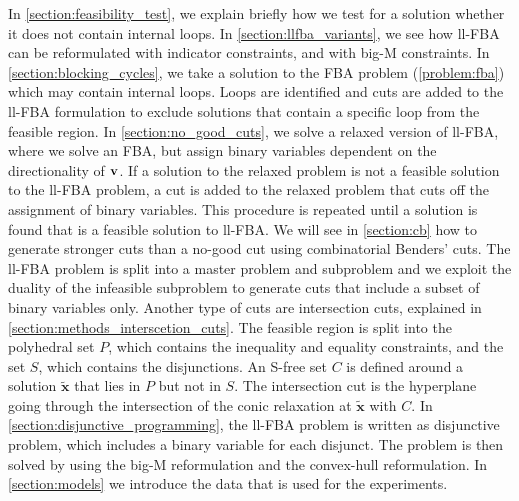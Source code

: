 In \cref{section:feasibility_test}, we explain briefly how we test for a solution whether it does not contain internal loops. 
In \cref{section:llfba_variants}, we see how ll-FBA can be reformulated with indicator constraints, and with big-M constraints.
In \cref{section:blocking_cycles}, we take a solution to the FBA problem (\cref{problem:fba}) which may contain internal loops. Loops are identified and cuts are added to the ll-FBA formulation to exclude solutions that contain a specific loop from the feasible region.
In \cref{section:no_good_cuts}, we solve a relaxed version of ll-FBA, where we solve an FBA, but assign binary variables dependent on the directionality of $\bold v$. If a solution to the relaxed problem is not a feasible solution to the ll-FBA problem, a cut is added to the relaxed problem that cuts off the assignment of binary variables. This procedure is repeated until a solution is found that is a feasible solution to ll-FBA. 
We will see in \cref{section:cb} how to generate stronger cuts than a no-good cut using combinatorial Benders' cuts. The ll-FBA problem is split into a master problem and subproblem and we exploit the duality of the infeasible subproblem to generate cuts that include a subset of binary variables only. 
Another type of cuts are intersection cuts, explained in \cref{section:methods_interscetion_cuts}. The feasible region is split into the polyhedral set $P$, which contains the inequality and equality constraints, and the set $S$, which contains the disjunctions. An S-free set $C$ is defined around a solution $\boldsymbol{\tilde x}$ that lies in $P$ but not in $S$. The intersection cut is the hyperplane going through the intersection of the conic relaxation at $\boldsymbol{\tilde x}$ with $C$. 
In \cref{section:disjunctive_programming}, the ll-FBA problem is written as disjunctive problem, which includes a binary variable for each disjunct. The problem is then solved by using the big-M reformulation and the convex-hull reformulation. In \cref{section:models} we introduce the data that is used for the experiments.



